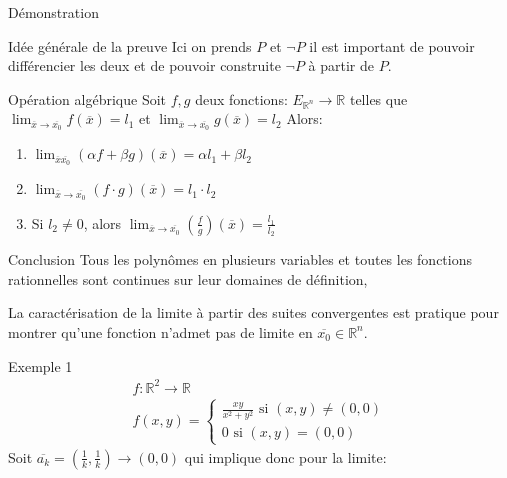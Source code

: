 \begin{parag}{Démonstration}
     \begin{subparag}{Idée générale de la preuve}
         Ici on prends $P$ et  $\neg P$ il est important de pouvoir différencier les deux et de pouvoir construite $\neg P$ à partir de $P$.
         
     \end{subparag}
 \end{parag}

 \begin{parag}{Opération algébrique}
     Soit $f, g$ deux fonctions: $ E_{ \mathbb{R}^n } \to \mathbb{R}$ telles que $\lim_{ \overline{x} \to \overline{x_0}}f( \overline{x}) = l_1$ et $\lim_{ \overline{x} \to \overline{x_0}}g( \overline{x}) = l_2$ Alors:
     \begin{enumerate}
         \item $\lim_{ \overline{x} \overline{x_0}} ( \alpha f + \beta g)( \overline{x}) = \alpha l_1 + \beta l_2$
         \item $\lim_{ \overline{x} \to \overline{x_0}} (f \cdot g)( \overline{x}) = l_1 \cdot l_2$ 
         \item Si $l_2 \neq 0$, alors $\lim_{ \overline{x} \to \overline{x_0}}( \frac{f}{g})( \overline{x}) = \frac{l_1}{l_2}$
     \end{enumerate}
    \begin{subparag}{Conclusion}
        Tous les polynômes en plusieurs variables et toutes les fonctions rationnelles sont continues sur leur domaines de définition,
        \begin{framedremark}
            La caractérisation de la limite à partir des suites convergentes est pratique pour montrer qu'une fonction n'admet pas de limite en $ \overline{x_0} \in \mathbb{R}^n $.
        \end{framedremark}
    \end{subparag} 
    \begin{subparag}{Exemple 1}
        \begin{align*}
            f: \mathbb{R}^2 \to \mathbb{R}\\
            f(x, y) = \begin{cases}
                \frac{xy}{x^2 + y^2} \text{ si } (x, y) \neq (0, 0)\\
                0 \text{ si } (x, y) = (0, 0)
            \end{cases}
        \end{align*}
        Soit $ \overline{a_k} = ( \frac{1}{k}, \frac{1}{k}) \to (0, 0)$ qui implique donc pour la limite:

\end{subparag}
\end{parag}
